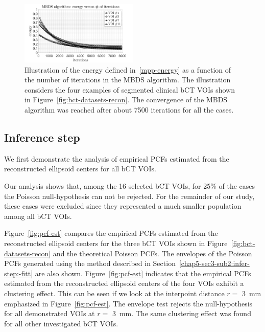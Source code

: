 \documentclass[journal]{IEEEtran}
\begin{document}
\begin{figure}[!htb]
  \centering
  \includegraphics[width=0.5\textwidth]
  {figure/convergence_mbds}
  \caption{Illustration of the energy defined in~\eqref{mpp-energy} as
    a function of the number of iterations in the MBDS algorithm. The
    illustration considers the four examples of segmented clinical bCT
    VOIs shown in Figure~\ref{fig:bct-datasets-recon}. The convergence
    of the MBDS algorithm was reached after about 7500 iterations for
    all the cases.}
  \label{fig:conv-mbds}
\end{figure}

\subsection{Inference step}
\label{chap4-sec4-sub2:result-infer-step}

We first demonstrate the analysis of empirical PCFs estimated from the
reconstructed ellipsoid centers for all bCT VOIs.

Our analysis shows that, among the 16 selected bCT VOIs, for 25\% of
the cases the Poisson null-hypothesis can not be rejected. For the
remainder of our study, these cases were excluded since they
represented a much smaller population among all bCT VOIs.

Figure~\ref{fig:pcf-est} compares the empirical PCFs estimated from
the reconstructed ellipsoid centers for the three bCT VOIs shown in
Figure~\ref{fig:bct-datasets-recon} and the theoretical Poisson
PCFs. The envelopes of the Poisson PCFs generated using the method
described in Section~\ref{chap5-sec3-sub2:infer-step:-fitt} are also
shown. Figure~\ref{fig:pcf-est} indicates that the empirical PCFs
estimated from the reconstructed ellipsoid centers of the four VOIs
exhibit a clustering effect. This can be seen if we look at the
interpoint distance $r = $ \SI{3}{\mm} emphasized in
Figure~\ref{fig:pcf-est}. The envelope test rejects the
null-hypothesis for all demonstrated VOIs at $r = $ \SI{3}{\mm}. The
same clustering effect was found for all other investigated bCT VOIs.
\end{document}

